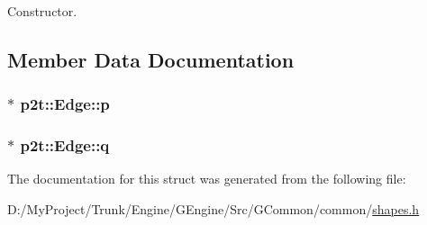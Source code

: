 Constructor. 



\subsection{Member Data Documentation}
\hypertarget{structp2t_1_1_edge_a5d0fe19975fb3ef1cd40df5e20afb302}{}
\subsubsection[{p}]{$\ast$ p2t\+::\+Edge\+::p}\label{structp2t_1_1_edge_a5d0fe19975fb3ef1cd40df5e20afb302}
\hypertarget{structp2t_1_1_edge_ae20ac7e995e83330fcc23b3235dcdeda}{}
\subsubsection[{q}]{ $\ast$ p2t\+::\+Edge\+::q}\label{structp2t_1_1_edge_ae20ac7e995e83330fcc23b3235dcdeda}


The documentation for this struct was generated from the following file\+:\begin{DoxyCompactItemize}
\item 
D\+:/\+My\+Project/\+Trunk/\+Engine/\+G\+Engine/\+Src/\+G\+Common/common/\hyperlink{shapes_8h}{shapes.\+h}\end{DoxyCompactItemize}

